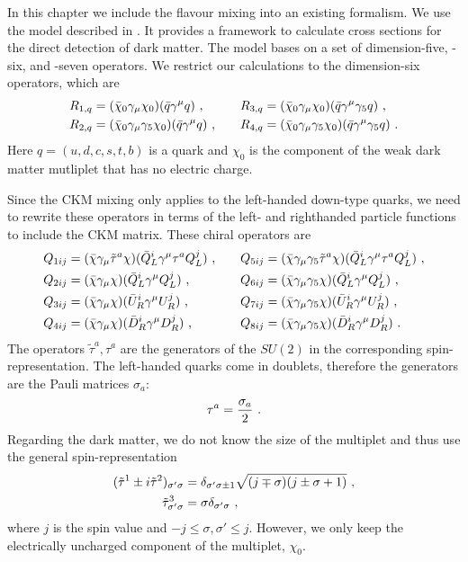 In this chapter we include the flavour mixing into an existing formalism. We use the model described in \cite{ChiralEFT}. It provides a framework to calculate cross sections for the direct detection of dark matter. The model bases on a set of dimension-five, -six, and -seven operators. We restrict our calculations to the dimension-six operators, which are
\begin{align}\label{eq:normal}
	R_{1,q} &= (\bar{\chi}_0\gamma_\mu\chi_0)(\bar{q}\gamma^\mu q) \ , && &R_{3,q} &= (\bar{\chi}_0\gamma_\mu\chi_0)(\bar{q}\gamma^\mu\gamma_5q) \ , \notag \\
	R_{2,q} &= (\bar{\chi}_0\gamma_\mu\gamma_5\chi_0)(\bar{q}\gamma^\mu q) \ , &&	&R_{4,q} &= (\bar{\chi}_0\gamma_\mu\gamma_5\chi_0)(\bar{q}\gamma^\mu\gamma_5q) \ .
\end{align}
Here $q=(u,d,c,s,t,b)$ is a quark and $\chi_0$ is the component of the weak dark matter mutliplet that has no electric charge.


Since the CKM mixing only applies to the left-handed down-type quarks, we need to rewrite these operators in terms of the left- and righthanded particle functions to include the CKM matrix. These chiral operators are
\begin{align}\label{eq:chiral}
	Q_{1ij} &= (\bar{\chi}\gamma_\mu\tilde{\tau}^a\chi)(\bar{Q}_L^i\gamma^\mu \tau^aQ_L^j) \ , && &Q_{5ij} &= (\bar{\chi}\gamma_\mu\gamma_5\tilde{\tau}^a\chi)(\bar{Q}_L^i\gamma^\mu \tau^aQ_L^j) \ , \notag \\
	Q_{2ij} &= (\bar{\chi}\gamma_\mu\chi)(\bar{Q}_L^i\gamma^\mu Q_L^j) \ , && &Q_{6ij} &= (\bar{\chi}\gamma_\mu\gamma_5\chi)(\bar{Q}_L^i\gamma^\mu Q_L^j) \ , \notag \\
	Q_{3ij} &= (\bar{\chi}\gamma_\mu\chi)(\bar{U}_R^i\gamma^\mu U_R^j) \ , && &Q_{7ij} &= (\bar{\chi}\gamma_\mu\gamma_5\chi)(\bar{U}_R^i\gamma^\mu U_R^j) \ , \notag \\
	Q_{4ij} &= (\bar{\chi}\gamma_\mu\chi)(\bar{D}_R^i\gamma^\mu D_R^j) \ , && &Q_{8ij} &= (\bar{\chi}\gamma_\mu\gamma_5\chi)(\bar{D}_R^i\gamma^\mu D_R^j) \ .
\end{align}
The operators $\tilde{\tau}^a,\tau^a$ are the generators of the $SU(2)$ in the corresponding spin-representation. The left-handed quarks come in doublets, therefore the generators are the Pauli matrices $\sigma_a$:
\begin{align}
	\tau^a = \frac{\sigma_a}{2} \ . \notag
\end{align}
Regarding the dark matter, we do not know the size of the multiplet and thus use the general spin-representation
\begin{align}
	(\tilde{\tau}^1 \pm i\tilde{\tau}^2)_{\sigma'\sigma} &= \delta_{\sigma'\sigma\pm1}\sqrt{(j\mp\sigma)(j\pm\sigma+1)} \ , \notag \\
	\tilde{\tau}^3_{\sigma'\sigma} &= \sigma\delta_{\sigma'\sigma} \ , \notag
\end{align}
where $j$ is the spin value and $-j\leq\sigma,\sigma'\leq j$. However, we only keep the electrically uncharged component of the multiplet, $\chi_0$.

